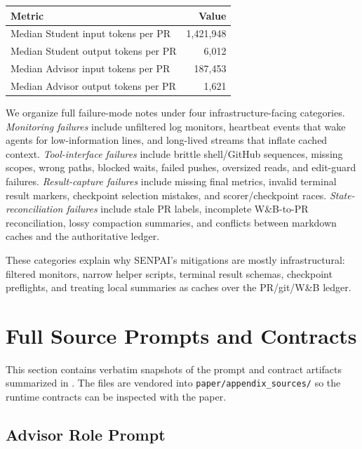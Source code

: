 \documentclass{article}
\newcommand{\promptfile}[1]{\VerbatimInput{#1}}
\begin{document}
\begin{center}
  \label{tab:app-pr-token-load}
  \small
  \begin{tabular}{@{}lr@{}}
    \toprule
    Metric & Value \\
    \midrule
    Median Student input tokens per PR & 1,421,948 \\
    Median Student output tokens per PR & 6,012 \\
    Median Advisor input tokens per PR & 187,453 \\
    Median Advisor output tokens per PR & 1,621 \\
    \bottomrule
  \end{tabular}
\end{center}

We organize full failure-mode notes under four infrastructure-facing categories. \textit{Monitoring failures} include unfiltered log monitors, heartbeat events that wake agents for low-information lines, and long-lived streams that inflate cached context. \textit{Tool-interface failures} include brittle shell/GitHub sequences, missing scopes, wrong paths, blocked waits, failed pushes, oversized reads, and edit-guard failures. \textit{Result-capture failures} include missing final metrics, invalid terminal result markers, checkpoint selection mistakes, and scorer/checkpoint races. \textit{State-reconciliation failures} include stale PR labels, incomplete W\&B-to-PR reconciliation, lossy compaction summaries, and conflicts between markdown caches and the authoritative ledger.

These categories explain why SENPAI's mitigations are mostly infrastructural: filtered monitors, narrow helper scripts, terminal result schemas, checkpoint preflights, and treating local summaries as caches over the PR/git/W\&B ledger.

\section{Full Source Prompts and Contracts}
\label{app:full-prompts}

This section contains verbatim snapshots of the prompt and contract artifacts summarized in . The files are vendored into \texttt{paper/appendix\_sources/} so the runtime contracts can be inspected with the paper.

\subsection{Advisor Role Prompt}
\label{app:full-advisor-prompt}
\promptfile{appendix_sources/claude_advisor.md}
\end{document}
